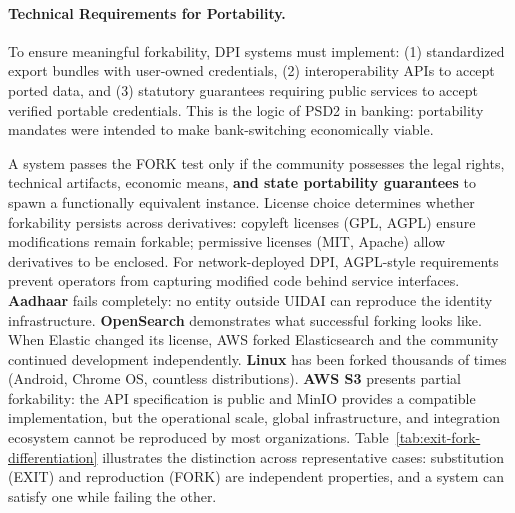 \documentclass{article}
\begin{document}
\paragraph{Technical Requirements for Portability.} To ensure meaningful forkability, DPI systems must implement: (1) standardized export bundles with user-owned credentials, (2) interoperability APIs to accept ported data, and (3) statutory guarantees requiring public services to accept verified portable credentials. This is the logic of PSD2 in banking: portability mandates were intended to make bank-switching economically viable.

A system passes the FORK test only if the community possesses the legal rights, technical artifacts, economic means, \textbf{and state portability guarantees} to spawn a functionally equivalent instance. License choice determines whether forkability persists across derivatives: copyleft licenses (GPL, AGPL) ensure modifications remain forkable; permissive licenses (MIT, Apache) allow derivatives to be enclosed. For network-deployed DPI, AGPL-style requirements prevent operators from capturing modified code behind service interfaces. \textbf{Aadhaar} fails completely: no entity outside UIDAI can reproduce the identity infrastructure. \textbf{OpenSearch} demonstrates what successful forking looks like. When Elastic changed its license, AWS forked Elasticsearch and the community continued development independently. \textbf{Linux} has been forked thousands of times (Android, Chrome OS, countless distributions). \textbf{AWS S3} presents partial forkability: the API specification is public and MinIO provides a compatible implementation, but the operational scale, global infrastructure, and integration ecosystem cannot be reproduced by most organizations. Table~\ref{tab:exit-fork-differentiation} illustrates the distinction across representative cases: substitution (EXIT) and reproduction (FORK) are independent properties, and a system can satisfy one while failing the other.
\end{document}
